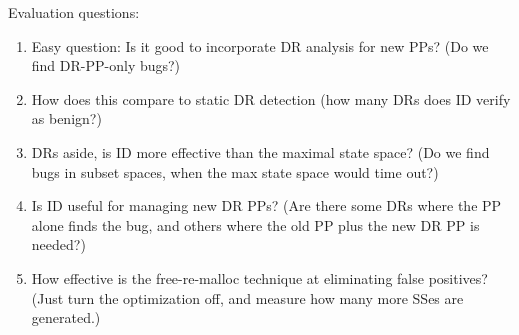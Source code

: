\documentclass[pldi]{sigplanconf-pldi15}
\begin{document}
Evaluation questions:
\begin{enumerate}
	\item Easy question: Is it good to incorporate DR analysis for new PPs? (Do we find DR-PP-only bugs?)
	\item How does this compare to static DR detection (how many DRs does ID verify as benign?)
	\item DRs aside, is ID more effective than the maximal state space? (Do we find bugs in subset spaces, when the max state space would time out?)
	\item Is ID useful for managing new DR PPs? (Are there some DRs where the PP alone finds the bug, and others where the old PP plus the new DR PP is needed?)
	\item How effective is the free-re-malloc technique at eliminating false positives? (Just turn the optimization off, and measure how many more SSes are generated.)



\end{enumerate}
\end{document}
